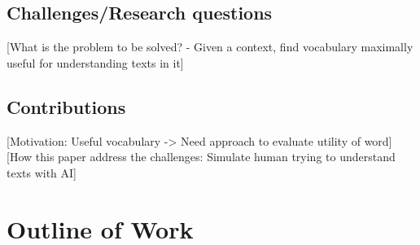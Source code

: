 \subsection{Challenges/Research questions}
[What is the problem to be solved? - Given a context, find vocabulary maximally useful for understanding texts in it]

\subsection{Contributions}
[Motivation: Useful vocabulary -> Need approach to evaluate utility of word]
[How this paper address the challenges: Simulate human trying to understand texts with AI]

\section{Outline of Work}



%
%
%

